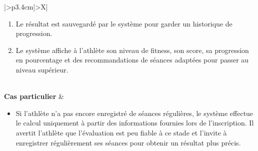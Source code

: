 ﻿\documentclass[a4paper,12pt]{report}
\begin{document}
\begin{table}[H]
\begin{tabularx}{\textwidth}{|>{\RaggedRight\arraybackslash}p{3.4cm}|>{\RaggedRight\arraybackslash}X|}
\begin{minipage}[t]{\linewidth}
\begin{enumerate}[label=\arabic*., leftmargin=*, topsep=0pt, itemsep=1pt]
    \item Le résultat est sauvegardé par le système pour garder un historique de progression.
    \item Le système affiche à l'athlète son niveau de fitness, son score, sa progression en pourcentage et des recommandations de séances adaptées pour passer au niveau supérieur.
\end{enumerate}
\vspace{2pt}
\end{minipage} \\
\hline
\textbf{Cas particulier} &
\begin{minipage}[t]{\linewidth}
\vspace{2pt}
\begin{itemize}[leftmargin=*, topsep=0pt, itemsep=1pt]
    \item Si l'athlète n'a pas encore enregistré de séances régulières, le système effectue le calcul uniquement à partir des informations fournies lors de l'inscription. Il avertit l'athlète que l'évaluation est peu fiable à ce stade et l'invite à enregistrer régulièrement ses séances pour obtenir un résultat plus précis.
\end{itemize}
\vspace{2pt}
\end{minipage} \\
\hline
\end{tabularx}
\fussy
\end{table}
\setlength{\emergencystretch}{3em}
\end{document}
